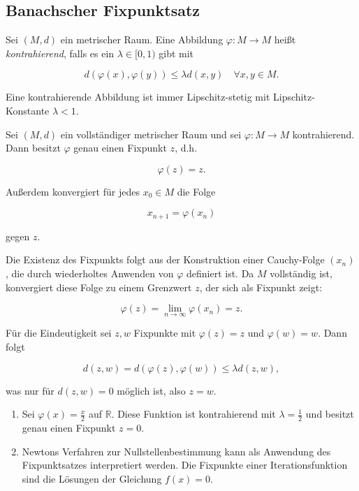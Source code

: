 \subsection{Banachscher Fixpunktsatz}

\begin{definition}{}
Sei $ (M, d) $ ein metrischer Raum. Eine Abbildung $ \varphi: M \to M $ heißt \emph{kontrahierend}, falls es ein $ \lambda \in [0,1) $ gibt mit


$$
d(\varphi(x), \varphi(y)) \leq \lambda d(x,y) \quad \forall x,y \in M.
$$


\end{definition}

\begin{bemerkungbox}
Eine kontrahierende Abbildung ist immer Lipschitz-stetig mit Lipschitz-Konstante $ \lambda < 1 $.
\end{bemerkungbox}

\begin{satz}{}
Sei $ (M, d) $ ein vollständiger metrischer Raum und sei $ \varphi: M \to M $ kontrahierend. Dann besitzt $ \varphi $ genau einen Fixpunkt $ z $, d.h.


$$
\varphi(z) = z.
$$


Außerdem konvergiert für jedes $ x_0 \in M $ die Folge


$$
x_{n+1} = \varphi(x_n)
$$


gegen $ z $.
\end{satz}

\begin{beweisbox}
Die Existenz des Fixpunkts folgt aus der Konstruktion einer Cauchy-Folge $ (x_n) $, die durch wiederholtes Anwenden von $ \varphi $ definiert ist. Da $ M $ vollständig ist, konvergiert diese Folge zu einem Grenzwert $ z $, der sich als Fixpunkt zeigt:


$$
\varphi(z) = \lim_{n \to \infty} \varphi(x_n) = z.
$$


Für die Eindeutigkeit sei $ z, w $ Fixpunkte mit $ \varphi(z) = z $ und $ \varphi(w) = w $. Dann folgt


$$
d(z, w) = d(\varphi(z), \varphi(w)) \leq \lambda d(z,w),
$$


was nur für $ d(z,w) = 0 $ möglich ist, also $ z = w $.
\end{beweisbox}

\begin{beispielbox}
\begin{enumerate}
    \item Sei $ \varphi(x) = \frac{x}{2} $ auf $ \mathbb{R} $. Diese Funktion ist kontrahierend mit $ \lambda = \frac{1}{2} $ und besitzt genau einen Fixpunkt $ z = 0 $.
    \item Newtons Verfahren zur Nullstellenbestimmung kann als Anwendung des Fixpunktsatzes interpretiert werden. Die Fixpunkte einer Iterationsfunktion sind die Lösungen der Gleichung $ f(x) = 0 $.
\end{enumerate}
\end{beispielbox}
